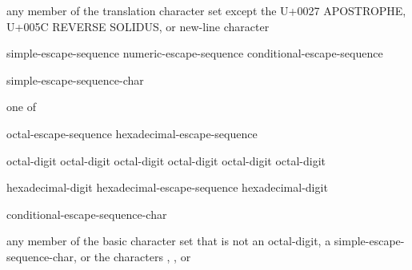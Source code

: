 \begin{bnf}
\br
    \textnormal{any member of the translation character set except the U+0027 APOSTROPHE,}\br
    \bnfindent\textnormal{U+005C REVERSE SOLIDUS, or new-line character}
\end{bnf}

\begin{bnf}
\br
    simple-escape-sequence\br
    numeric-escape-sequence\br
    conditional-escape-sequence
\end{bnf}

\begin{bnf}
\br
    \terminal{\textbackslash} simple-escape-sequence-char
\end{bnf}

\begin{bnf}
 \textnormal{one of}\br
\end{bnf}

\begin{bnf}
\br
    octal-escape-sequence\br
    hexadecimal-escape-sequence
\end{bnf}

\begin{bnf}
\br
    \terminal{\textbackslash} octal-digit\br
    \terminal{\textbackslash} octal-digit octal-digit\br
    \terminal{\textbackslash} octal-digit octal-digit octal-digit
\end{bnf}

\begin{bnf}
\br
     hexadecimal-digit\br
    hexadecimal-escape-sequence hexadecimal-digit
\end{bnf}

\begin{bnf}
\br
    \terminal{\textbackslash} conditional-escape-sequence-char
\end{bnf}

\begin{bnf}
\br
    \textnormal{any member of the basic character set that is not an} octal-digit\textnormal{, a} simple-escape-sequence-char\textnormal{, or the characters , , or }
\end{bnf}

